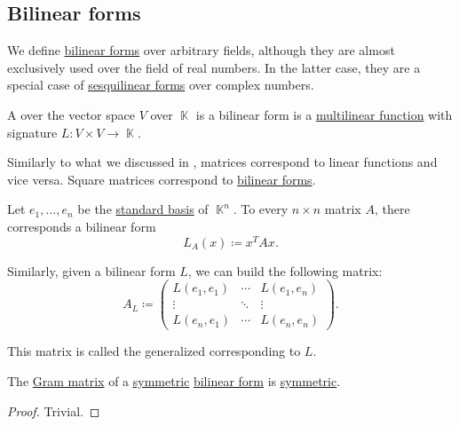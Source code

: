 \subsection{Bilinear forms}\label{subsec:bilinear_forms}

We define \hyperref[def:bilinear_form]{bilinear forms} over arbitrary fields, although they are almost exclusively used over the field of real numbers. In the latter case, they are a special case of \hyperref[def:sesquilinear_form]{sesquilinear forms} over complex numbers.

\begin{definition}\label{def:bilinear_form}
  A  over the vector space \( V \) over \( \BbbK \) is a bilinear form is a \hyperref[def:multilinear_function]{multilinear function} with signature \( L: V \times V \to \BbbK \).
\end{definition}

\begin{remark}\label{rem:matrices_as_bilinear_forms}
  Similarly to what we discussed in , matrices correspond to linear functions and vice versa. Square matrices correspond to \hyperref[def:bilinear_form]{bilinear forms}.

  Let \( e_1, \ldots, e_n \) be the \hyperref[def:standard_basis]{standard basis} of \( \BbbK^n \). To every \( n \times n \) matrix \( A \), there corresponds a bilinear form
  \begin{equation*}
    L_A(x) \coloneqq x^T A x.
  \end{equation*}

  Similarly, given a bilinear form \( L \), we can build the following matrix:
  \begin{equation*}
    A_L \coloneqq
    \begin{pmatrix}
      L(e_1, e_1) & \cdots & L(e_1, e_n) \\
      \vdots      & \ddots & \vdots      \\
      L(e_n, e_1) & \cdots & L(e_n, e_n)
    \end{pmatrix}.
  \end{equation*}

  This matrix is called the generalized  corresponding to \( L \).
\end{remark}

\begin{proposition}\label{thm:symmetric_bilinear_form_matrix}
  The \hyperref[rem:matrices_as_bilinear_forms]{Gram matrix} of a \hyperref[def:symmetric_function]{symmetric} \hyperref[def:bilinear_form]{bilinear form} is \hyperref[def:transpose_matrix]{symmetric}.
\end{proposition}
\begin{proof}
  Trivial.
\end{proof}

